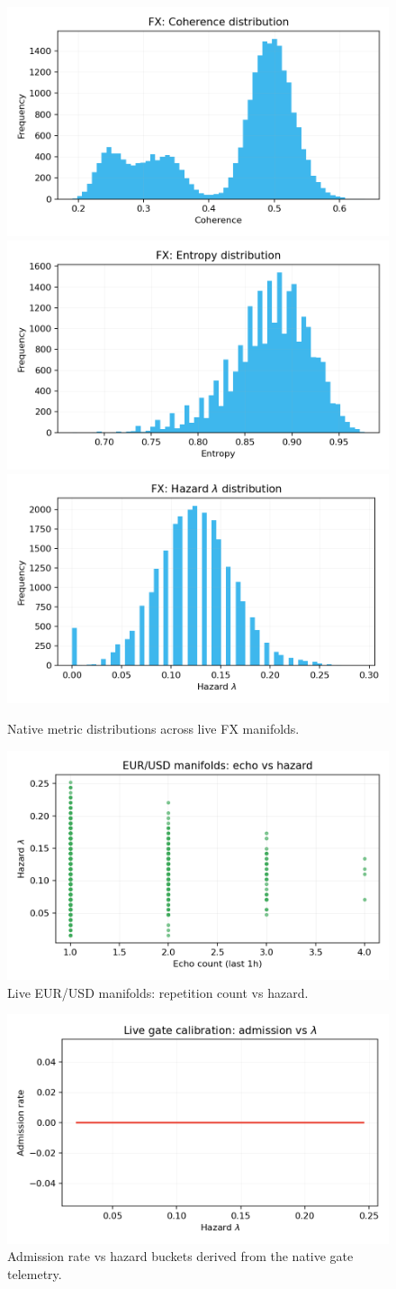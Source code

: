 \documentclass[11pt]{article}
\begin{document}
\begin{figure}[t]
  \centering
  \includegraphics[width=0.32\linewidth]{../figures/fx_metrics/fx_coherence_hist.png}
  \includegraphics[width=0.32\linewidth]{../figures/fx_metrics/fx_entropy_hist.png}
  \includegraphics[width=0.32\linewidth]{../figures/fx_metrics/fx_lambda_hist.png}
  \caption{Native metric distributions across live FX manifolds.}
  \label{fig:fx-metrics}
\end{figure}

\begin{figure}[t]
  \centering
  \includegraphics[width=0.75\linewidth]{../figures/fig2_spt_echo_vs_lambda.png}
  \caption{Live EUR/USD manifolds: repetition count vs hazard.}
  \label{fig:echo-vs-lambda}
\end{figure}

\begin{figure}[t]
  \centering
  \includegraphics[width=0.75\linewidth]{../figures/fig2b_spt_lambda_calibration.png}
  \caption{Admission rate vs hazard buckets derived from the native gate telemetry.}
  \label{fig:lambda-admission}
\end{figure}
\end{document}
